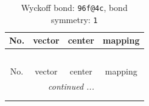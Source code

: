 \documentclass[fleqn,8pt]{jsarticle}
\begin{document}
\renewcommand{\arraystretch}{1.2}
\begin{longtable}{cccc}
\caption{Wyckoff bond: {\tt 96f@4c}, bond symmetry: {\tt 1}}
 \\
 \hline \hline
No. & vector & center & mapping \\ \hline \endfirsthead

\multicolumn{3}{l}{\tablename\ \thetable{}} \\
 \hline \hline
No. & vector & center & mapping \\ \hline \endhead

 \hline \hline
\multicolumn{3}{r}{\footnotesize\it continued ...} \\ \endfoot

 \hline \hline
\multicolumn{3}{r}{} \\ \endlastfoot


\end{longtable}
\end{document}
